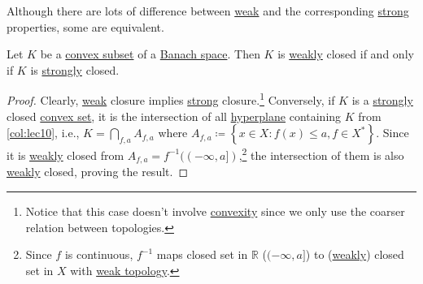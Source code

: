 Although there are lots of difference between \hyperref[def:weak-topology]{weak} and the corresponding \hyperref[note:strong-topology]{strong} properties, some are equivalent.

\begin{proposition}\label{prop:weak-closedness}
	Let \(K\) be a \hyperref[def:convex-set]{convex subset} of a \hyperref[def:Banach-space]{Banach space}. Then \(K\) is \hyperref[def:weak-topology]{weakly} closed if and only if \(K\) is \hyperref[note:strong-topology]{strongly} closed.
\end{proposition}
\begin{proof}
	Clearly, \hyperref[def:weak-topology]{weak} closure implies \hyperref[note:strong-topology]{strong} closure.\footnote{Notice that this case doesn't involve \hyperref[def:convex-set]{convexity} since we only use the coarser relation between topologies.} Conversely, if \(K\) is a \hyperref[note:strong-topology]{strongly} closed \hyperref[def:convex-set]{convex set}, it is the intersection of all \hyperref[def:hyperplane]{hyperplane} containing \(K\) from \autoref{col:lec10}, i.e., \(K = \bigcap_{f, a} A_{f, a}\) where \(A_{f, a}\coloneqq \left\{ x\in X \colon f(x) \leq a, f\in X^{\ast} \right\} \). Since it is \hyperref[def:weak-topology]{weakly} closed from \(A_{f, a}= f^{-1} ((-\infty , a])\),\footnote{Since \(f\) is continuous, \(f^{-1} \) maps closed set in \(\mathbb{R}\) (\((-\infty , a]\)) to (\hyperref[def:weak-topology]{weakly}) closed set in \(X\) with \hyperref[def:weak-topology]{weak topology}.} the intersection of them is also \hyperref[def:weak-topology]{weakly} closed, proving the result.
\end{proof}
